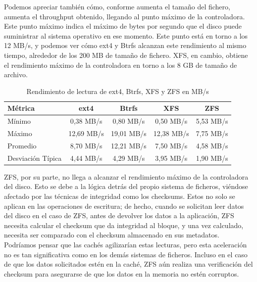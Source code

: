 Podemos apreciar también cómo, conforme aumenta el tamaño del fichero, aumenta el throughput obtenido, llegando al punto máximo de la controladora. Este punto máximo indica el máximo de bytes por segundo que el disco puede suministrar al sistema operativo en ese momento. Este punto está en torno a los 12 MB/s, y podemos ver cómo ext4 y Btrfs alcanzan este rendimiento al mismo tiempo, alrededor de los 200 MB de tamaño de fichero. XFS, en cambio, obtiene el rendimiento máximo de la controladora en torno a los 8 GB de tamaño de archivo. \\

\begin{table}[h!]
\centering
\caption{Rendimiento de lectura de ext4, Btrfs, XFS y ZFS en MB/s}
\begin{tabular}{|l|c|c|c|c|}
\hline
\textbf{Métrica} & \textbf{ext4} & \textbf{Btrfs} & \textbf{XFS} & \textbf{ZFS} \\ \hline
Mínimo           & 0,38 MB/s     & 0,80 MB/s      & 0,50 MB/s    & 5,53 MB/s \\ \hline
Máximo           & 12,69 MB/s    & 19,01 MB/s     & 12,38 MB/s   & 7,75 MB/s \\ \hline
Promedio         & 8,70 MB/s     & 12,21 MB/s     & 7,50 MB/s    & 4,58 MB/s \\ \hline
Desviación Típica & 4,44 MB/s     & 4,29 MB/s      & 3,95 MB/s    & 1,90 MB/s \\ \hline
\end{tabular}
\label{tab:rendimiento_lectura_sistemas_archivos}
\end{table}

ZFS, por su parte, no llega a alcanzar el rendimiento máximo de la controladora del disco. Esto se debe a la lógica detrás del propio sistema de ficheros, viéndose afectado por las técnicas de integridad como los checksums. Estos no solo se aplican en las operaciones de escritura; de hecho, cuando se solicitan leer datos del disco en el caso de ZFS, antes de devolver los datos a la aplicación, ZFS necesita calcular el checksum que da integridad al bloque, y una vez calculado, necesita ser comparado con el checksum almacenado en sus metadatos. \\

Podríamos pensar que las cachés agilizarían estas lecturas, pero esta aceleración no es tan significativa como en los demás sistemas de ficheros. Incluso en el caso de que los datos solicitados estén en la caché, ZFS aún realiza una verificación del checksum para asegurarse de que los datos en la memoria no estén corruptos. \\

